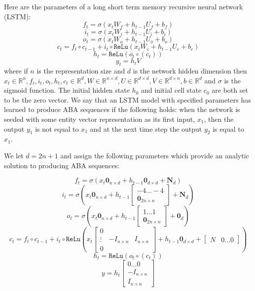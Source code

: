 \documentclass[12pt]{article}
\begin{document}
Here are the parameters of a long short term memory recursive neural network (LSTM):
%
\[f_t = \sigma(x_t W_f  + h_{t-1} U_f  + b_f) \]
\[i_t = \sigma(x_t W_i  + h_{t-1} U_i + b_i) \]
\[o_t = \sigma(x_t W_o +  h_{t-1} U_o + b_o)\]
\[c_t = f_t \circ c_{t-1} + i_t \circ \texttt{ReLu}(x_tW_c + h_{t-1}U_c + b_c) \]
\[h_t = \texttt{ReLu}(o_t \circ (c_t))\]
\[y_t = h_tV\]
%
where if $n$ is the representation size and $d$ is the network hidden dimension then $x_t \in \mathbb{R}^n, f_t, i_t, o_t,  h_t, c_t \in \mathbb{R}^d, W \in \mathbb{R}^{n \times d}, U \in \mathbb{R}^{d \times d}, V \in \mathbb{R}^{d \times n}, b \in \mathbb{R}^d$ and $\sigma$ is the sigmoid function. The initial hidden state $h_0$ and initial cell state $c_0$ are both set to be the zero vector. We say that an LSTM model with specified parameters has learned to produce ABA sequences if the following holds: when the network is seeded with some entity vector representation as its first input, $x_1$, then the output $y_1$ is not equal to $x_1$ and at the next time step the output $y_2$ is equal to $x_1$.

We let $d = 2n + 1$ and assign the following parameters which provide an analytic solution to producing ABA sequences:

\[f_t = \sigma(x_t \textbf{0}_{n\times d} + h_{t-1}\textbf{0}_{d \times d} + \textbf{N}_{d}) \]
\[i_t = \sigma(x_t\textbf{0}_{n\times d} + h_{t-1}\begin{bmatrix} -4 \dots -4 \\ \textbf{0}_{2n\times n} \end{bmatrix}  + \textbf{N}_d)   \]
\[o_t = \sigma(x_t\textbf{0}_{n\times d} +  h_{t-1} \begin{bmatrix} 1 \dots 1 \\ \textbf{0}_{2n\times n} \end{bmatrix} + \textbf{0}_{d})\]
\[c_t = f_t \circ c_{t-1} + i_t \circ \texttt{ReLu}(x_t \begin{bmatrix} 0 &  & \\ \vdots & -I_{n \times n} & I_{n \times n}\\ 0 & &  \end{bmatrix} + h_{t-1}\textbf{0}_{d \times d} + \begin{bmatrix} N & 0 \dots 0\end{bmatrix}) \]
\[h_t = \texttt{ReLu}(o_t \circ (c_t))\]
\[y = h_t \begin{bmatrix} 0 \dots 0 \\ -I_{n \times n} \\ I_{n \times n}  \end{bmatrix}\]
\end{document}
